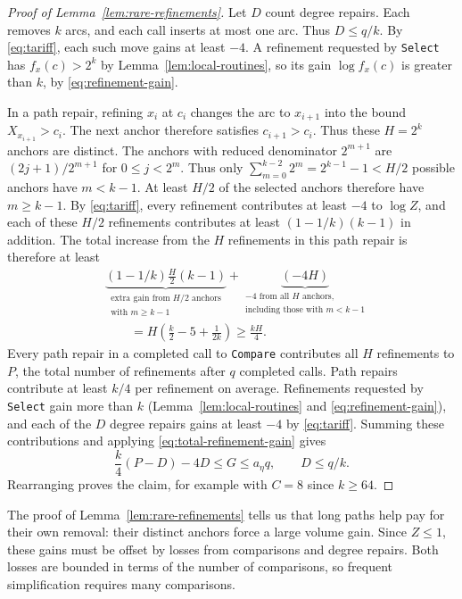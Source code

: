 \begin{proof}[Proof of Lemma~\ref{lem:rare-refinements}]
Let $D$ count degree repairs. Each removes $k$ arcs, and each call
inserts at most one arc. Thus $D\le q/k$. By \eqref{eq:tariff}, each such
move gains at least $-4$. A refinement requested by \texttt{Select} has
$f_x(c)>2^k$ by Lemma~\ref{lem:local-routines}, so its gain
$\log f_x(c)$ is greater than $k$, by \eqref{eq:refinement-gain}.

In a path repair, refining $x_i$ at $c_i$ changes the arc to $x_{i+1}$
into the bound $X_{x_{i+1}}>c_i$. The next anchor therefore satisfies
$c_{i+1}>c_i$. Thus these $H=2^k$ anchors are distinct. The anchors with
reduced denominator $2^{m+1}$ are $(2j+1)/2^{m+1}$ for $0\le j<2^m$.
Thus only $\sum_{m=0}^{k-2}2^m=2^{k-1}-1<H/2$ possible anchors have
$m<k-1$. At least $H/2$ of the selected anchors therefore have $m\ge k-1$.
By \eqref{eq:tariff}, every refinement contributes at least $-4$ to
$\log Z$, and each of these $H/2$ refinements contributes at least
$(1-1/k)(k-1)$ in addition. The total increase from the $H$ refinements
in this path repair is therefore at least
\[
\begin{aligned}
&\underbrace{(1-1/k)\frac H2(k-1)}_{
  \substack{\text{extra gain from }H/2\text{ anchors}\\
            \text{with }m\ge k-1}}
+\underbrace{(-4H)}_{
  \substack{-4\text{ from all }H\text{ anchors,}\\
            \text{including those with }m<k-1}}
\\[1ex]
&\qquad=H\left(\frac{k}{2}-5+\frac1{2k}\right)\ge\frac{kH}{4}.
\end{aligned}
\]
Every path repair in a completed call to \texttt{Compare} contributes
all $H$ refinements to $P$, the total number of refinements after $q$
completed calls. Path repairs contribute at least $k/4$ per refinement
on average. Refinements requested by \texttt{Select} gain more than $k$
(Lemma~\ref{lem:local-routines} and \eqref{eq:refinement-gain}), and
each of the $D$ degree repairs gains at least $-4$ by \eqref{eq:tariff}.
Summing these contributions and applying \eqref{eq:total-refinement-gain} gives
\[
\frac k4(P-D)-4D\le G\le a_\eta q,\qquad D\le q/k.
\]
Rearranging proves the claim, for example with
$C=8$ since $k\ge64$.
\end{proof}

The proof of Lemma~\ref{lem:rare-refinements} tells us that long paths
help pay for their own removal: their distinct anchors force
a large volume gain. Since $Z\le1$, these gains must be offset by losses
from comparisons and degree repairs. Both losses are bounded in terms
of the number of comparisons, so frequent simplification requires many
comparisons.


